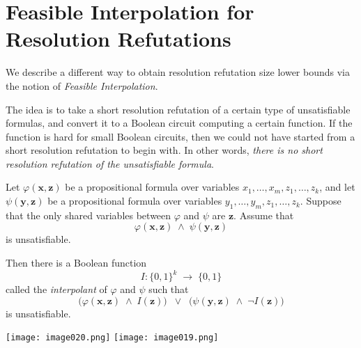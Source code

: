 \section{Feasible Interpolation for Resolution Refutations}
We describe a different way to obtain resolution refutation size lower bounds via the notion of \emph{Feasible Interpolation}. 

The idea is to take a short resolution refutation of a certain type of unsatisfiable formulas, and convert it to a Boolean circuit computing a certain function. If the function is hard for small Boolean circuits, then we could not have started from a short resolution refutation to begin with. In other words, \emph{there is no short resolution refutation of the unsatisfiable formula}.


\bigskip

\begin{theorem}
Let \(\varphi(\mathbf{x},\mathbf{z})\) be a propositional formula over variables \(x_{1},\dots,x_{m}, z_{1},\dots,z_{k}\), and let \(\psi(\mathbf{y},\mathbf{z})\) be a propositional formula over variables \(y_{1},\dots,y_{m}, z_{1},\dots,z_{k}\). 
Suppose that the only shared variables between \(\varphi\) and \(\psi\) are \(\mathbf{z}\). 
Assume that 
\[
\varphi(\mathbf{x},\mathbf{z}) \;\land\; \psi(\mathbf{y},\mathbf{z})
\]
is unsatisfiable.

Then there is a Boolean function 
\[
I \colon \{0,1\}^k \;\to\;\{0,1\}
\]
called the \emph{interpolant} of \(\varphi\) and \(\psi\) such that
\[
\bigl(\varphi(\mathbf{x},\mathbf{z}) \;\land\; I(\mathbf{z})\bigr)
\;\;\lor\;\;
\bigl(\psi(\mathbf{y},\mathbf{z}) \;\land\;\neg I(\mathbf{z})\bigr)
\]
is unsatisfiable.
\end{theorem}


\texttt{[image: image020.png]}
\texttt{[image: image019.png]}



